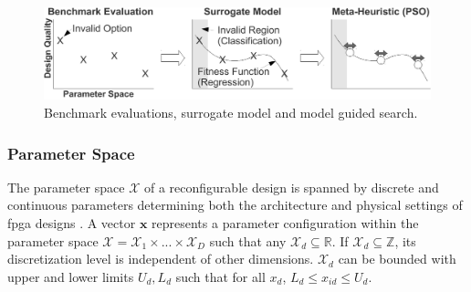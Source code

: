 \documentclass[12pt, runningheads,a4paper]{llncs}
\begin{document}


  \begin{figure}
     \centering
\includegraphics[width=1.0\textwidth]{./figs/surrogate_tobias.pdf}
        \caption{Benchmark evaluations, surrogate model and model guided search.}     
           \label{fig:ouridea}
  \end{figure}
 

\subsubsection{Parameter Space} 
\label{designspace}
The parameter space $\mathcal{X}$ of a reconfigurable design is spanned by discrete and continuous parameters determining both the architecture and physical settings of \ac{fpga} designs \cite{arc2012MLO}. A vector $\mathbf{x}$ represents a parameter configuration within the parameter space $\mathcal{X} = \mathcal{X}_1 \times ... \times \mathcal{X}_D $ such that any $\mathcal{X}_{d} \subseteq \mathbb{R}$. If $\mathcal{X}_{d} \subseteq \mathbb{Z}$, its discretization level is independent of other dimensions. $\mathcal{X}_{d}$ can be bounded with upper and lower limits $U_d,L_d$ such that for all $x_{d}$, $L_d \leq x_{id} \leq U_d$.

\end{document}
